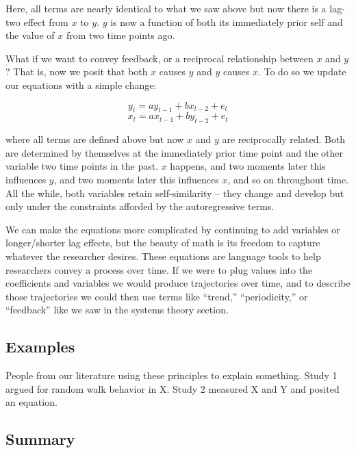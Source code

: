 \documentclass[english,,man]{apa6}
\theoremstyle{definition}
\theoremstyle{definition}
\theoremstyle{definition}
\theoremstyle{remark}
\begin{document}
\noindent Here, all terms are nearly identical to what we saw above but
now there is a lag-two effect from \(x\) to \(y\). \(y\) is now a
function of both its immediately prior self and the value of \(x\) from
two time points ago.

What if we want to convey feedback, or a reciprocal relationship between
\(x\) and \(y\)? That is, now we posit that both \(x\) causes \(y\) and
\(y\) causes \(x\). To do so we update our equations with a simple
change:

\begin{equation}
\label{sysy3}
y_{t} = a y_{t - 1} + b x_{t - 2} + e_{t}
\end{equation} \begin{equation}
\label{sysx3}
x_{t} = a x_{t - 1} + b y_{t - 2} + e_{t}
\end{equation}

\noindent where all terms are defined above but now \(x\) and \(y\) are
reciprocally related. Both are determined by themselves at the
immediately prior time point and the other variable two time points in
the past. \(x\) happens, and two moments later this influences \(y\),
and two moments later this influences \(x\), and so on throughout time.
All the while, both variables retain self-similarity -- they change and
develop but only under the constraints afforded by the autoregressive
terms.

We can make the equations more complicated by continuing to add
variables or longer/shorter lag effects, but the beauty of math is its
freedom to capture whatever the researcher desires. These equations are
language tools to help researchers convey a process over time. If we
were to plug values into the coefficients and variables we would produce
trajectories over time, and to describe those trajectories we could then
use terms like \enquote{trend,} \enquote{periodicity,} or
\enquote{feedback} like we saw in the systems theory section.

\hypertarget{examples-1}{%
\subsection{Examples}\label{examples-1}}

People from our literature using these principles to explain something.
Study 1 argued for random walk behavior in X. Study 2 measured X and Y
and posited an equation.

\hypertarget{summary-1}{%
\subsection{Summary}\label{summary-1}}
\end{document}
